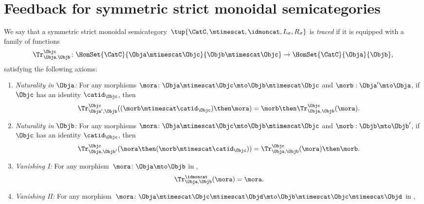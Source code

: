 \section{Feedback for symmetric strict monoidal semicategories}


\begin{ctdefinition}
    \label{def:traced-fun-stack-scat}
    We say that a symmetric strict monoidal semicategory~$\tup{\CatC,\mtimescat, \idmoncat, L_\sigma, R_\sigma}$ is \emph{traced} if it is equipped with a family of functions
    \begin{equation}
        \Tr_{\Obja,\Objb}^\Objc\colon \HomSet{\CatC}{\Obja \mtimescat \Objc}{\Objb\mtimescat \Objc}\to \HomSet{\CatC}{\Obja}{\Objb},
    \end{equation}
    satisfying the following axioms:
    \begin{enumerate}
        \item \emph{Naturality in $\Obja$:} For any morphisms $\mora\colon \Obja\mtimescat \Objc \mto \Objb\mtimescat \Objc$ and $\morb : \Obja' \mto \Obja$, if $\Objc$ has an identity $\catid_\Objc$, then 
              \begin{equation}
                  \Tr_{\Obja', \Objb}^\Objc ( (\morb \mtimescat \catid_\Objc) \then \mora) = \morb \then \Tr_{\Obja, \Objb}^\Objc (\mora).
              \end{equation}
        \item \emph{Naturality in $\Objb$:} For any morphisms $\mora\colon \Obja\mtimescat \Objc \mto \Objb\mtimescat \Objc$ and $\morb : \Objb \mto \Objb'$, if $\Objc$ has an identity $\catid_\Objc$, then
              \begin{equation}
                  \Tr_{\Obja, \Objb'}^\Objc ( \mora \then (\morb \mtimescat \catid_\Objc) ) =  \Tr_{\Obja, \Objb}^\Objc (\mora) \then \morb.
              \end{equation}
        \item \emph{Vanishing I:} For any morphism~$\mora \colon \Obja\mto \Objb$ in \CatC,
              \begin{equation}
                  \label{eq:vanishing_1}
                  \Tr_{\Obja,\Objb}^\idmoncat (\mora)=\mora.
              \end{equation}
       \item \emph{Vanishing II:} For any morphism~$\mora \colon \Obja\mtimescat \Objc \mtimescat \Objd \mto \Objb\mtimescat \Objc \mtimescat \Objd$ in \CatC,

\end{enumerate}
\end{ctdefinition}
